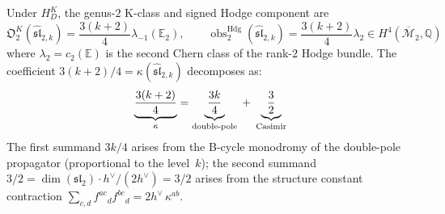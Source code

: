 \begin{theorem}\label{thm:sl2-genus2-curvature}
Under $H_D^K$, the genus-$2$ K-class and signed Hodge component are
\begin{equation}\label{eq:sl2-obs2}
\mathfrak O_2^K(\widehat{\mathfrak{sl}}_{2,k})
=\frac{3(k+2)}4\lambda_{-1}(\mathbb E_2),
\qquad
\operatorname{obs}^{\mathrm{Hdg}}_2(\widehat{\mathfrak{sl}}_{2,k})
= \frac{3(k+2)}{4} \lambda_2
\in H^4(\overline{\mathcal{M}}_2,\mathbb Q)
\end{equation}
where $\lambda_2 = c_2(\mathbb{E})$ is the second Chern class of the
rank-$2$ Hodge bundle. The coefficient $3(k+2)/4 = \kappa(\widehat{\mathfrak{sl}}_{2,k})$
decomposes as:
\begin{equation}\label{eq:sl2-kappa-decomp-genus2}
\underbrace{\frac{3(k+2)}{4}}_{\kappa}
= \underbrace{\frac{3k}{4}}_{\textup{double-pole}}
\;+\; \underbrace{\frac{3}{2}}_{\textup{Casimir}}
\end{equation}
The first summand $3k/4$ arises from the B-cycle monodromy of the
double-pole propagator \textup{(}proportional to the level~$k$\textup{)};
the second summand $3/2 = \dim(\mathfrak{sl}_2) \cdot h^\vee / (2h^\vee)
= 3/2$ arises from the structure constant contraction
$\sum_{c,d} f^{ac}{}_d f^{bc}{}_d = 2h^\vee\, \kappa^{ab}$.
\end{theorem}

